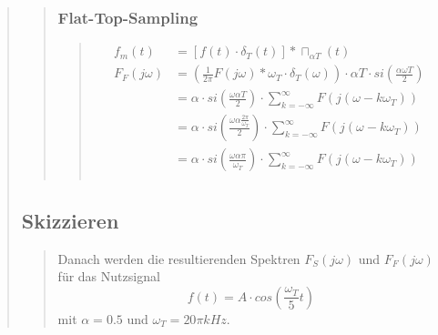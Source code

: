 \begin{quote}
\begin{quote}
        \subsubsection{Flat-Top-Sampling}
        \begin{quote}
            \begin{equation*}
                \begin{split}
                    f_m (t) &= [f (t) \cdot \delta_T (t)] \ast \sqcap_{\alpha T} (t)\\
                    F_F (j\omega) &= \left ( \frac{1}{2 \pi} F (j\omega) \ast \omega_T
                    \cdot \delta_T (\omega) \right) \cdot \alpha T \cdot si (\frac{\alpha \omega T}{2})\\
                    &= \alpha \cdot si \left( \frac{\omega \alpha T}{2} \right) \cdot \sum_{k=-\infty}^{\infty} F(j(\omega -
                    k\omega_T))\\
                    &= \alpha \cdot si \left( \frac{\omega \alpha \frac{2 \pi}{\omega_T}}{2} \right) \cdot
                    \sum_{k=-\infty}^{\infty} F(j(\omega - k\omega_T))\\
                    &= \alpha \cdot si \left( \frac{\omega \alpha \pi}{\omega_T} \right) \cdot
                    \sum_{k=-\infty}^{\infty} F(j(\omega - k\omega_T))\\
                \end{split}
            \end{equation*}
        \end{quote} %
    \end{quote}  %
    \subsection{Skizzieren}
    \begin{quote}
                
        Danach werden die resultierenden Spektren $F_S (j\omega)$ und $F_F (j\omega)$
        für das Nutzsignal
        \begin{equation*}
        f(t) = A \cdot cos(\frac{\omega_T}{5}t)     
        \end{equation*}
		    mit $\alpha = 0.5$ und $\omega_T = 20\pi kHz$.
        

\end{quote}
\end{quote}
